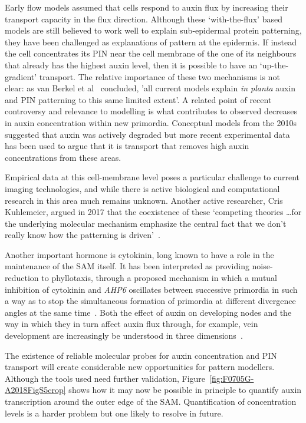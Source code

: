 Early flow models assumed that cells respond to auxin flux by increasing their transport capacity in the flux direction. Although these `with-the-flux' based models are still believed to work well to explain  sub-epidermal protein patterning, they have been challenged as explanations of pattern at the epidermis.  If instead the cell concentrates its PIN near the cell membrane of the one of its neighbours that already has the highest auxin level, then it is possible to 
have an `up-the-gradient' transport. The relative importance of these two mechanisms is  not  clear: as van Berkel et al~\autocite{berkelPolarAuxinTransport2013} concluded, 'all current models explain \textit{in planta} auxin and PIN patterning to this same limited extent'. A related point of recent controversy and relevance to modelling is what contributes to observed decreases in auxin concentration within new primordia. Conceptual models from the 2010s suggested that auxin was actively degraded but more recent experimental data has been used to argue that it is transport that removes high auxin concentrations from these areas.

Empirical data at this cell-membrane level poses a particular challenge  to current imaging technologies, and while there is active biological and computational research in this area much remains unknown. Another active researcher, Cris Kuhlemeier,  argued in 2017 that the coexistence of these `competing theories \ldots  for the underlying molecular mechanism emphasize the central fact that we don't really know how the patterning is driven'~\autocite{kuhlemeierPhyllotaxis2017}. 


Another important hormone is cytokinin, long known to have a role in the maintenance of the SAM itself. It has been interpreted as providing noise-reduction to phyllotaxis, through a proposed mechanism in which a mutual inhibition of cytokinin and \textit{AHP6} oscillates between successive primordia in such a way as to stop the simultaneous formation of primordia at different divergence angles at the same time~\cite{besnardCytokininSignallingInhibitory2014}. Both the effect of auxin on developing nodes and the way in which they in turn affect auxin flux through, for example, vein development are increasingly  be understood in three dimensions~\autocite{debPhyllotaxisInvolvesAuxin2015}.
 
The existence of reliable molecular probes for auxin concentration and PIN transport will create considerable new opportunities for pattern modellers. Although the tools used need further validation,  Figure~\ref{fig:F0705G-A2018FigS5crop} shows how it may now be possible in principle to quantify auxin transcription around the outer edge of the SAM. Quantification of concentration levels is a harder problem but one likely to resolve in future. %

